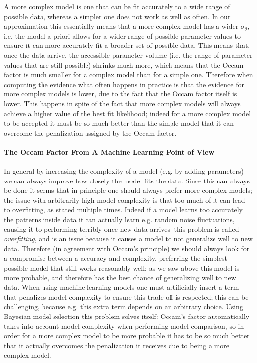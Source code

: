A more complex model is one that can be fit accurately to a wide range of possible data, whereas a simpler one does not work as well as often. In our approximation this essentially means that a more complex model has a wider $\sigma_\theta$, i.e. the model a priori allows for a wider range of possible parameter values to ensure it can more accurately fit a broader set of possible data. This means that, once the data arrive, the accessible parameter volume (i.e. the range of parameter values that are still possible) shrinks much more, which means that the Occam factor is much smaller for a complex model than for a simple one. Therefore when computing the evidence what often happens in practice is that the evidence for more complex models is lower, due to the fact that the Occam factor itself is lower. This happens in spite of the fact that more complex models will always achieve a higher value of the best fit likelihood; indeed for a more complex model to be accepted it must be so much better than the simple model that it can overcome the penalization assigned by the Occam factor.


\paragraph{The Occam Factor From A Machine Learning Point of View}
In general by increasing the complexity of a model (e.g. by adding parameters) we can always improve how closely the model fits the data. Since this can always be done it seems that in principle one should always prefer more complex models; the issue with arbitrarily high model complexity is that too much of it can lead to overfitting, as stated multiple times. Indeed if a model learns too accurately the patterns inside data it can actually learn e.g. random noise fluctuations, causing it to performing terribly once new data arrives; this problem is called \emph{overfitting}, and is an issue because it causes a model to not generalize well to new data. Therefore (in agreement with Occam's principle) we should always look for a compromise between a accuracy and complexity, preferring the simplest possible model that still works reasonably well; as we saw above this model is more probable, and therefore has the best chance of generalizing well to new data. 
When using machine learning models one must artificially insert a term that penalizes model complexity to ensure this trade-off is respected; this can be challenging, because e.g. this extra term depends on an arbitrary choice. Using Bayesian model selection this problem solves itself: Occam's factor automatically takes into account model complexity when performing model comparison, so in order for a more complex model to be more probable it has to be so much better that it actually overcomes the penalization it receives due to being a more complex model.



